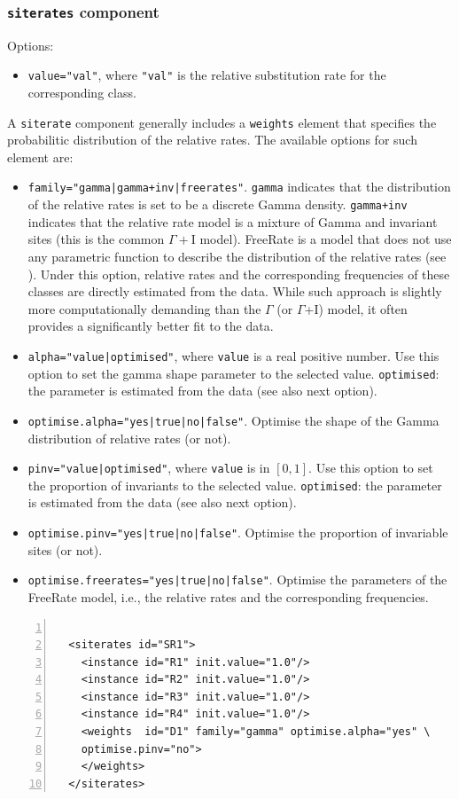 \documentclass[a4paper,12pt]{article}
\newcommand{\x}[1]{\texttt{#1}}
\begin{document}
\subsubsection{{\tt siterates} component}
Options:
\begin{itemize}
\item \x{value="val"}, where \x{"val"} is the relative substitution rate for the corresponding class.
\end{itemize}
A \x{siterate} component generally includes a \x{weights} element that specifies the probabilitic
distribution of the relative rates. The available options for such element are:
\begin{itemize}
\item \x{family="gamma|gamma+inv|freerates"}. \x{gamma} indicates that the distribution of the
  relative rates is set to be a discrete Gamma density. \x{gamma+inv} indicates that the relative rate model
  is a mixture of Gamma and invariant sites (this is the common $\Gamma+$I model). FreeRate is
  a model that does not use any parametric function to describe the distribution of the relative
  rates (see \cite{soubrier12}). Under this option, relative rates and the corresponding frequencies of these classes are
  directly estimated from the data. While such approach is slightly more computationally demanding
  than the $\Gamma$ (or $\Gamma$+I) model, it often provides a significantly better fit to the data.
\item \x{alpha="value|optimised"}, where \x{value} is a real positive number. Use this option to set
   the gamma shape parameter to the selected value. \x{optimised}: the parameter is estimated from
   the data (see also next option).
\item \x{optimise.alpha="yes|true|no|false"}. Optimise the shape of the Gamma distribution of
  relative rates (or not).
\item \x{pinv="value|optimised"}, where \x{value} is in $[0,1]$. Use this option to set
   the proportion of invariants to the selected value. \x{optimised}: the parameter is estimated from
   the data (see also next option).
\item \x{optimise.pinv="yes|true|no|false"}. Optimise the proportion of invariable sites (or not).
\item \x{optimise.freerates="yes|true|no|false"}. Optimise the parameters of the FreeRate model,
  i.e., the relative rates and the corresponding frequencies.
\end{itemize}
\vspace{0.2cm}
\begin{Verbatim}[frame=single, label=Example of `siterates' component (discrete gamma model), samepage=true,
  baselinestretch=0.5, fontsize=\small, numbers=left]

  <siterates id="SR1">
    <instance id="R1" init.value="1.0"/>
    <instance id="R2" init.value="1.0"/>
    <instance id="R3" init.value="1.0"/>
    <instance id="R4" init.value="1.0"/>
    <weights  id="D1" family="gamma" optimise.alpha="yes" \
    optimise.pinv="no">
    </weights>
  </siterates>
\end{Verbatim}
\end{document}
